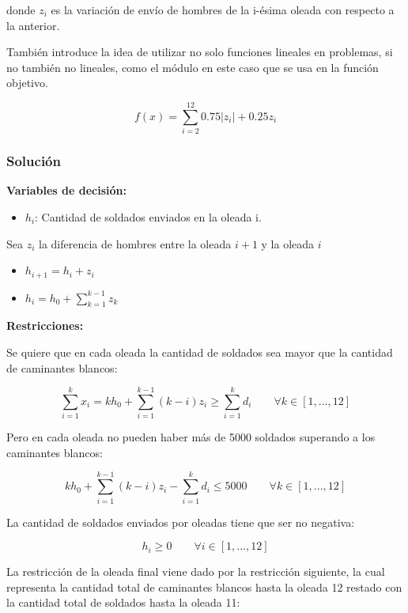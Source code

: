 \documentclass[a4paper,10pt,twocolumn]{article}
\theoremstyle{theorem}
\theoremstyle{definition}
\theoremstyle{remark}
\begin{document}
donde $z_i$ es la variación de envío de hombres de la i-ésima oleada con respecto a la anterior.

También introduce la idea de utilizar no solo funciones lineales en problemas, si no también no lineales, como el módulo en este caso que se usa en la función objetivo.

$$
f(x) = \sum_{i=2}^{12} 0.75 |z_i| + 0.25 z_i
$$

		\subsubsection{Solución}\label{subsubsec:sol_ejer_5}

\textbf{Variables de decisión:}

\begin{itemize}
	\item $h_i$: Cantidad de soldados enviados en la oleada i.
\end{itemize}

Sea $z_i$ la diferencia de hombres entre la oleada $i+1$ y la oleada $i$

\begin{itemize}

	\item $h_{i+1} = h_i + z_i$
	\item $h_{i} = h_0 + \sum_{k=1}^{k-1} z_k$
	
\end{itemize}

\textbf{Restricciones:}

Se quiere que en cada oleada la cantidad de soldados sea mayor que la cantidad de caminantes blancos:

$$
\sum_{i=1}^{k} x_i = k h_0 + \sum_{i=1}^{k-1}(k-i)z_i \ge \sum_{i=1}^k d_i \qquad \forall k \in [1,...,12]
$$

Pero en cada oleada no pueden haber más de 5000 soldados superando a los caminantes blancos:

$$
k h_0 + \sum_{i=1}^{k-1}(k-i)z_i - \sum_{i=1}^k d_i \le 5000 \qquad \forall k \in [1,...,12]
$$

La cantidad de soldados enviados por oleadas tiene que ser no negativa:

$$
h_i \ge 0 \qquad \forall i \in [1,...,12]
$$

La restricción de la oleada final viene dado por la restricción siguiente, la cual representa la cantidad total de caminantes blancos hasta la oleada 12 restado con la cantidad total de soldados hasta la oleada 11:
\end{document}
